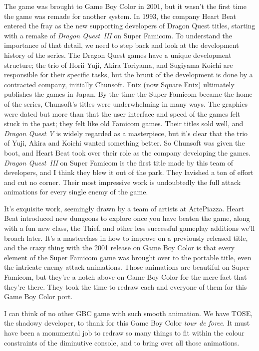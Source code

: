 \documentclass{book}
\begin{document}
The game was brought to Game Boy Color in 2001, but it wasn’t the first time the game was remade for another system. In 1993, the company Heart Beat entered the fray as the new supporting developers of Dragon Quest titles, starting with a remake of \emph{Dragon Quest III} on Super Famicom. To understand the importance of that detail, we need to step back and look at the development history of the series. The Dragon Quest games have a unique development structure; the trio of Horii Yuji, Akira Toriyama, and Sugiyama Koichi are responsible for their specific tasks, but the brunt of the development is done by a contracted company, initially Chunsoft. Enix (now Square Enix) ultimately publishes the games in Japan. By the time the Super Famicom became the home of the series, Chunsoft’s titles were underwhelming in many ways. The graphics were dated but more than that the user interface and speed of the games felt stuck in the past; they felt like old Famicom games. Their titles sold well, and \emph{Dragon Quest V} is widely regarded as a masterpiece, but it’s clear that the trio of Yuji, Akira and Koichi wanted something better. So Chunsoft was given the boot, and Heart Beat took over their role as the company developing the games. \emph{Dragon Quest III} on Super Famicom is the first title made by this team of developers, and I think they blew it out of the park. They lavished a ton of effort and cut no corner. Their most impressive work is undoubtedly the full attack animations for every single enemy of the game.

It’s exquisite work, seemingly drawn by a team of artists at ArtePiazza. Heart Beat introduced new dungeons to explore once you have beaten the game, along with a fun new class, the Thief, and other less successful gameplay additions we’ll broach later. It’s a masterclass in how to improve on a previously released title, and the crazy thing with the 2001 release on Game Boy Color is that every element of the Super Famicom game was brought over to the portable title, even the intricate enemy attack animations. Those animations are beautiful on Super Famicom, but they’re a notch above on Game Boy Color for the mere fact that they’re there. They took the time to redraw each and everyone of them for this Game Boy Color port.

I can think of no other GBC game with such smooth animation. We have TOSE, the shadowy developer, to thank for this Game Boy Color \emph{tour de force}. It must have been a monumental job to redraw so many things to fit within the colour constraints of the diminutive console, and to bring over all those animations.
\end{document}
